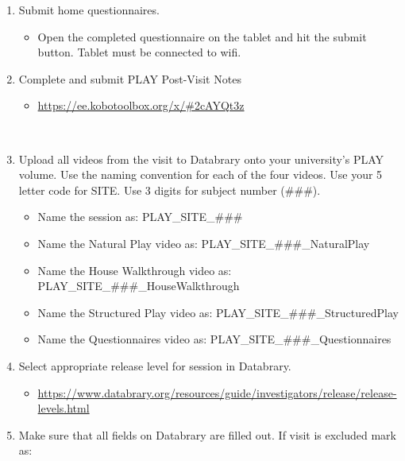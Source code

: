 \documentclass[
]{book}
\providecommand{\tightlist}{%
  \setlength{\itemsep}{0pt}\setlength{\parskip}{0pt}}
\begin{document}
\begin{enumerate}
\def\labelenumi{\arabic{enumi}.}
\tightlist
\item
  Submit home questionnaires.

  \begin{itemize}
  \tightlist
  \item
    Open the completed questionnaire on the tablet and hit the submit button. Tablet must be connected to wifi.\\
  \end{itemize}
\item
  Complete and submit PLAY Post-Visit Notes

  \begin{itemize}
  \tightlist
  \item
    \url{https://ee.kobotoolbox.org/x/\#2cAYQt3z}\strut \\
  \end{itemize}
\item
  Upload all videos from the visit to Databrary onto your university's PLAY volume.
  Use the naming convention for each of the four videos. Use your 5 letter code for SITE. Use 3 digits for subject number (\#\#\#).

  \begin{itemize}
  \tightlist
  \item
    Name the session as: PLAY\_SITE\_\#\#\#\\
  \item
    Name the Natural Play video as: PLAY\_SITE\_\#\#\#\_NaturalPlay\\
  \item
    Name the House Walkthrough video as: PLAY\_SITE\_\#\#\#\_HouseWalkthrough\\
  \item
    Name the Structured Play video as: PLAY\_SITE\_\#\#\#\_StructuredPlay\\
  \item
    Name the Questionnaires video as: PLAY\_SITE\_\#\#\#\_Questionnaires\\
  \end{itemize}
\item
  Select appropriate release level for session in Databrary.

  \begin{itemize}
  \tightlist
  \item
    \url{https://www.databrary.org/resources/guide/investigators/release/release-levels.html}
  \end{itemize}
\item
  Make sure that all fields on Databrary are filled out.
  If visit is excluded mark as:


\end{enumerate}
\end{document}
